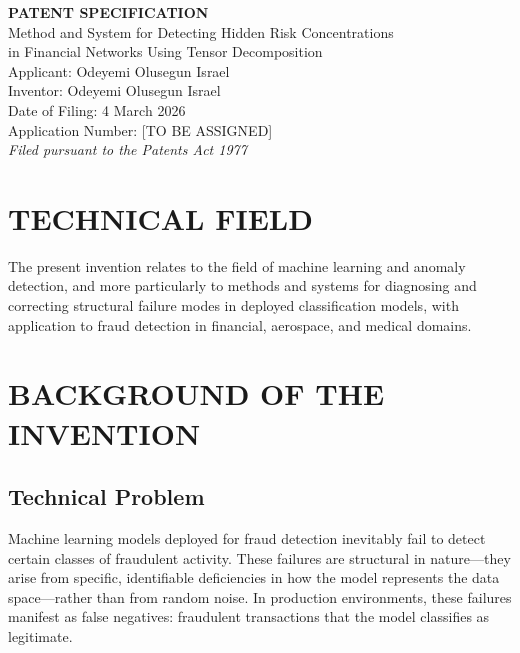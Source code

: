 \documentclass[12pt,a4paper]{article}
\begin{document}
\begin{center}
{\LARGE\bfseries PATENT SPECIFICATION}\\[1em]
{\Large Method and System for Detecting Hidden Risk Concentrations\\
in Financial Networks Using Tensor Decomposition}\\[2em]
{\large Applicant: Odeyemi Olusegun Israel}\\[0.5em]
{\large Inventor: Odeyemi Olusegun Israel}\\[0.5em]
{\large Date of Filing: 4 March 2026}\\[0.5em]
{\large Application Number: [TO BE ASSIGNED]}\\[0.3em]
{\normalsize \textit{Filed pursuant to the Patents Act 1977}}
\end{center}

\vspace{2em}

\section{TECHNICAL FIELD}

The present invention relates to the field of machine learning and 
anomaly detection, and more particularly to methods and systems for 
diagnosing and correcting structural failure modes in deployed classification 
models, with application to fraud detection in financial, aerospace, and 
medical domains.

\section{BACKGROUND OF THE INVENTION}

\subsection{Technical Problem}

Machine learning models deployed for fraud detection inevitably fail to 
detect certain classes of fraudulent activity. These failures are structural 
in nature---they arise from specific, identifiable deficiencies in how the 
model represents the data space---rather than from random noise. In 
production environments, these failures manifest as false negatives: 
fraudulent transactions that the model classifies as legitimate.
\end{document}
